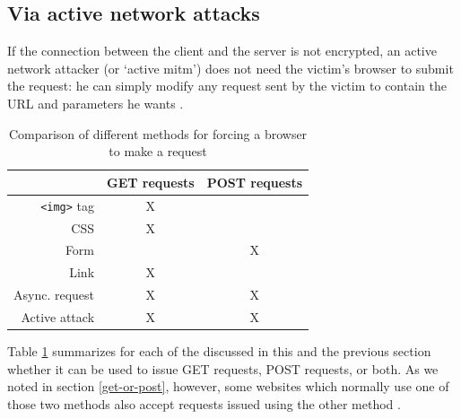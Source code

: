 \subsection{Via active network attacks}

If the connection between the client and the server is not encrypted, an active network attacker (or `active \gls{mitm}') does not need the victim's browser to submit the request: he can simply modify any request sent by the victim to contain the URL and parameters he wants \cite{Barth2008}.

\begin{table}[htb]
	\centering
	\begin{tabular}{r|cc}
		& GET requests & POST requests\\
		\hline
		\texttt{<img>} tag & X & \\
		CSS & X & \\
		Form &  & X \\
		Link & X & \\
		Async. request & X & X \\
		Active attack & X & X
	\end{tabular}
	\caption{Comparison of different methods for forcing a browser to make a request}
	\label{tab:forcing-request}
\end{table}

Table \ref{tab:forcing-request} summarizes for each of the discussed in this and the previous section whether it can be used to issue GET requests, POST requests, or both. As we noted in section \ref{get-or-post}, however, some websites which normally use one of those two methods also accept requests issued using the other method \cite{Zeller2008}.
